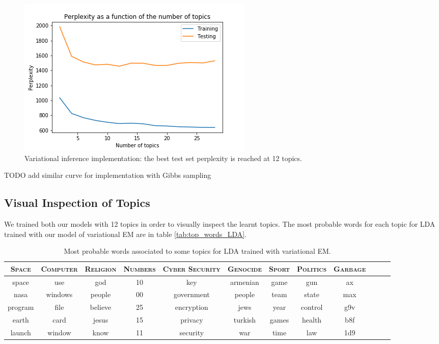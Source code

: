 \documentclass{article}
\begin{document}
\begin{figure}[ht]
\vskip 0.2in
\begin{center}
\centerline{\includegraphics[width=\columnwidth]{perplexity_as_a_function_of_number_of_topics}}
\caption{Variational inference implementation: the best test set perplexity is reached at 12 topics.}
\label{perplexity}
\end{center}
\vskip -0.2in
\end{figure} 

TODO add similar curve for implementation with Gibbs sampling

\subsection{Visual Inspection of Topics}
We trained both our models with 12 topics in order to visually inspect the learnt topics. The most probable words for each topic for LDA trained with our model of variational EM are in table \ref{tab:top_words_LDA}.

\begin{table}[htp]
\caption{\label{tab:top_words_LDA} Most probable words associated to some topics for LDA trained with variational EM.}
\vskip 0.15in
\begin{center}
\begin{small}
\begin{tabular}{c|c|c|c|c|c|c|c|c|c|c|c}
\textsc{Space} & \textsc{Computer} & \textsc{Religion} & \textsc{Numbers} & \textsc{Cyber Security} & \textsc{Genocide} & \textsc{Sport} & \textsc{Politics} & \textsc{Garbage} \\
\hline 
space & use & god & 10 & key & armenian & game & gun & ax \\
nasa & windows & people & 00 & government & people & team & state & max \\
program & file & believe & 25 & encryption & jews & year & control & g9v \\
earth & card & jesus & 15 & privacy & turkish & games & health & b8f \\
launch & window & know & 11 & security & war & time & law & 1d9
\end{tabular}
\end{small}
\end{center}
\label{default}
\end{table}%
\end{document}
